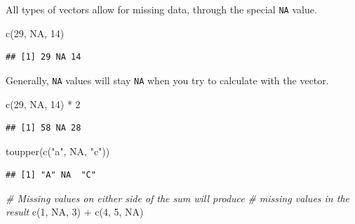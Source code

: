\documentclass[
]{book}
\newenvironment{Shaded}{\begin{snugshade}}{\end{snugshade}}
\newcommand{\CommentTok}[1]{\textcolor[rgb]{0.56,0.35,0.01}{\textit{#1}}}
\newcommand{\ConstantTok}[1]{\textcolor[rgb]{0.00,0.00,0.00}{#1}}
\newcommand{\DecValTok}[1]{\textcolor[rgb]{0.00,0.00,0.81}{#1}}
\newcommand{\FunctionTok}[1]{\textcolor[rgb]{0.00,0.00,0.00}{#1}}
\newcommand{\NormalTok}[1]{#1}
\newcommand{\SpecialCharTok}[1]{\textcolor[rgb]{0.00,0.00,0.00}{#1}}
\newcommand{\StringTok}[1]{\textcolor[rgb]{0.31,0.60,0.02}{#1}}
\begin{document}
All types of vectors allow for missing data, through the special \texttt{NA}
value.

\begin{Shaded}
\begin{Highlighting}[]
\FunctionTok{c}\NormalTok{(}\DecValTok{29}\NormalTok{, }\ConstantTok{NA}\NormalTok{, }\DecValTok{14}\NormalTok{)}
\end{Highlighting}
\end{Shaded}

\begin{verbatim}
## [1] 29 NA 14
\end{verbatim}

Generally, \texttt{NA} values will stay \texttt{NA} when you try to calculate
with the vector.

\begin{Shaded}
\begin{Highlighting}[]
\FunctionTok{c}\NormalTok{(}\DecValTok{29}\NormalTok{, }\ConstantTok{NA}\NormalTok{, }\DecValTok{14}\NormalTok{) }\SpecialCharTok{*} \DecValTok{2}
\end{Highlighting}
\end{Shaded}

\begin{verbatim}
## [1] 58 NA 28
\end{verbatim}

\begin{Shaded}
\begin{Highlighting}[]
\FunctionTok{toupper}\NormalTok{(}\FunctionTok{c}\NormalTok{(}\StringTok{"a"}\NormalTok{, }\ConstantTok{NA}\NormalTok{, }\StringTok{"c"}\NormalTok{))}
\end{Highlighting}
\end{Shaded}

\begin{verbatim}
## [1] "A" NA  "C"
\end{verbatim}

\begin{Shaded}
\begin{Highlighting}[]
\CommentTok{\# Missing values on either side of the sum will produce}
\CommentTok{\#   missing values in the result}
\FunctionTok{c}\NormalTok{(}\DecValTok{1}\NormalTok{, }\ConstantTok{NA}\NormalTok{, }\DecValTok{3}\NormalTok{) }\SpecialCharTok{+} \FunctionTok{c}\NormalTok{(}\DecValTok{4}\NormalTok{, }\DecValTok{5}\NormalTok{, }\ConstantTok{NA}\NormalTok{)}
\end{Highlighting}
\end{Shaded}
\end{document}
